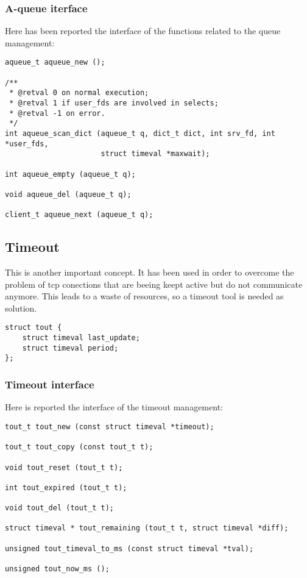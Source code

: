\subsubsection{A-queue iterface}
Here has been reported the interface of the functions related to the queue management:
\begin{lstlisting}
aqueue_t aqueue_new ();

/**                                                                                                        
 * @retval 0 on normal execution;                                                                          
 * @retval 1 if user_fds are involved in selects;                                                          
 * @retval -1 on error.                                                                                    
 */
int aqueue_scan_dict (aqueue_t q, dict_t dict, int srv_fd, int *user_fds,
                      struct timeval *maxwait);

int aqueue_empty (aqueue_t q);

void aqueue_del (aqueue_t q);

client_t aqueue_next (aqueue_t q);
\end{lstlisting}

\subsection{Timeout}
This is another important concept. It has been used in order to overcome the problem of tcp conections
that are beeing keept active but do not communicate anymore. This leads to a waste of resources, so
a timeout tool is needed as solution.
\begin{lstlisting}
struct tout {
    struct timeval last_update;
    struct timeval period;
};
\end{lstlisting}

\subsubsection{Timeout interface}
Here is reported the interface of the timeout management:
\begin{lstlisting}
tout_t tout_new (const struct timeval *timeout);

tout_t tout_copy (const tout_t t);

void tout_reset (tout_t t);

int tout_expired (tout_t t);

void tout_del (tout_t t);

struct timeval * tout_remaining (tout_t t, struct timeval *diff);

unsigned tout_timeval_to_ms (const struct timeval *tval);

unsigned tout_now_ms ();
\end{lstlisting}
